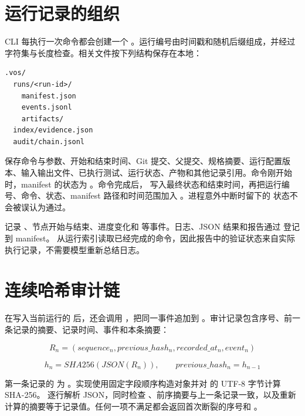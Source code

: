 \section{运行记录的组织}

CLI 每执行一次命令都会创建一个 。运行编号由时间戳和随机后缀组成，并经过字符集与长度检查。相关文件按下列结构保存在本地：

\begin{lstlisting}[language={},caption={本地运行记录目录}]
.vos/
  runs/<run-id>/
    manifest.json
    events.jsonl
    artifacts/
  index/evidence.json
  audit/chain.jsonl
\end{lstlisting}

 保存命令与参数、开始和结束时间、Git 提交、父提交、规格摘要、运行配置版本、输入输出文件、已执行测试、运行状态、产物和其他记录引用。命令刚开始时，manifest 的状态为 。命令完成后， 写入最终状态和结束时间，再把运行编号、命令、状态、manifest 路径和时间范围加入 。进程意外中断时留下的  状态不会被误认为通过。

 记录 、节点开始与结束、进度变化和  等事件。日志、JSON 结果和报告通过  登记到 manifest。 从运行索引读取已经完成的命令，因此报告中的验证状态来自实际执行记录，不需要模型重新总结日志。

\section{连续哈希审计链}

 在写入当前运行的  后，还会调用 ，把同一事件追加到 。审计记录包含序号、前一条记录的摘要、记录时间、事件和本条摘要：

\begin{equation}
  R_n=(sequence_n, previous\_hash_n, recorded\_at_n, event_n)
\end{equation}

\begin{equation}
  h_n=SHA256(JSON(R_n)), \qquad previous\_hash_n=h_{n-1}
\end{equation}

第一条记录的  为 。实现使用固定字段顺序构造对象并对  的 UTF-8 字节计算 SHA-256。 逐行解析 JSON，同时检查 、前序摘要与上一条记录一致，以及重新计算的摘要等于记录值。任何一项不满足都会返回首次断裂的序号和 。

